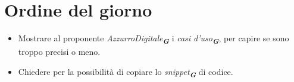 

\section{Ordine del giorno}

\begin{itemize}
    \item Mostrare al proponente \emph{AzzurroDigitale}\textsubscript{\textbf{\textit{G}}} i \emph{casi d'uso}\textsubscript{\textbf{\textit{G}}}, per capire se sono troppo precisi o meno. 
    \item Chiedere per la possibilità di copiare lo \emph{snippet}\textsubscript{\textbf{\textit{G}}} di codice.
\end{itemize}
